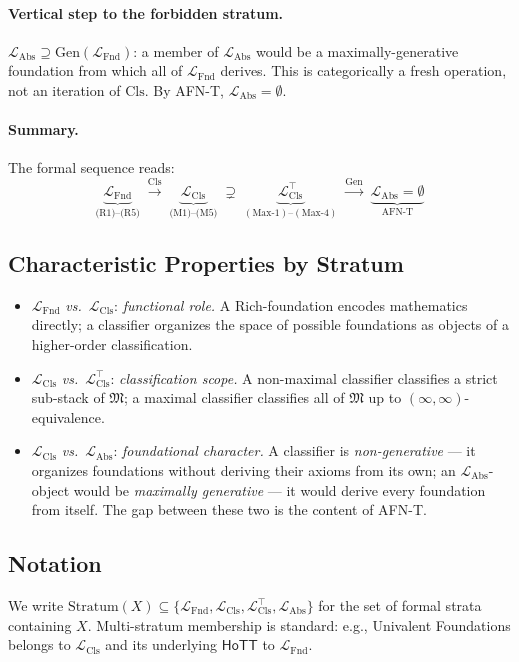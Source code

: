\documentclass[11pt]{article}
\theoremstyle{plain}
\theoremstyle{definition}
\newcommand{\fM}{\mathfrak{M}}
\newcommand{\LFnd}{\mathcal{L}_{\mathrm{Fnd}}}
\newcommand{\LCls}{\mathcal{L}_{\mathrm{Cls}}}
\newcommand{\LClsMax}{\mathcal{L}_{\mathrm{Cls}}^{\top}}
\newcommand{\LAbs}{\mathcal{L}_{\mathrm{Abs}}}
\newcommand{\HoTT}{\mathsf{HoTT}}
\begin{document}
\paragraph{Vertical step to the forbidden stratum.} $\LAbs \supseteq \mathrm{Gen}(\LFnd)$: a member of $\LAbs$ would be a maximally-generative foundation from which all of $\LFnd$ derives. This is categorically a fresh operation, not an iteration of $\mathrm{Cls}$. By AFN-T, $\LAbs = \emptyset$.

\paragraph{Summary.} The formal sequence reads:
\[
\underbrace{\LFnd}_{\text{(R1)--(R5)}} \; \xrightarrow{\mathrm{Cls}} \; \underbrace{\LCls}_{\text{(M1)--(M5)}} \; \supsetneq \; \underbrace{\LClsMax}_{(\mathrm{Max}\text{-1})\text{--}(\mathrm{Max}\text{-4})} \; \xrightarrow{\mathrm{Gen}} \; \underbrace{\LAbs = \emptyset}_{\text{AFN-T}}
\]

\subsection{Characteristic Properties by Stratum}

\begin{itemize}
\item $\LFnd$ \emph{vs.}\ $\LCls$: \emph{functional role.} A Rich-foundation encodes mathematics directly; a classifier organizes the space of possible foundations as objects of a higher-order classification.
\item $\LCls$ \emph{vs.}\ $\LClsMax$: \emph{classification scope.} A non-maximal classifier classifies a strict sub-stack of $\fM$; a maximal classifier classifies all of $\fM$ up to $(\infty, \infty)$-equivalence.
\item $\LCls$ \emph{vs.}\ $\LAbs$: \emph{foundational character.} A classifier is \emph{non-generative} --- it organizes foundations without deriving their axioms from its own; an $\LAbs$-object would be \emph{maximally generative} --- it would derive every foundation from itself. The gap between these two is the content of AFN-T.
\end{itemize}

\subsection{Notation}

We write $\mathrm{Stratum}(X) \subseteq \{\LFnd, \LCls, \LClsMax, \LAbs\}$ for the set of formal strata containing $X$. Multi-stratum membership is standard: e.g., Univalent Foundations belongs to $\LCls$ and its underlying $\HoTT$ to $\LFnd$.
\end{document}

